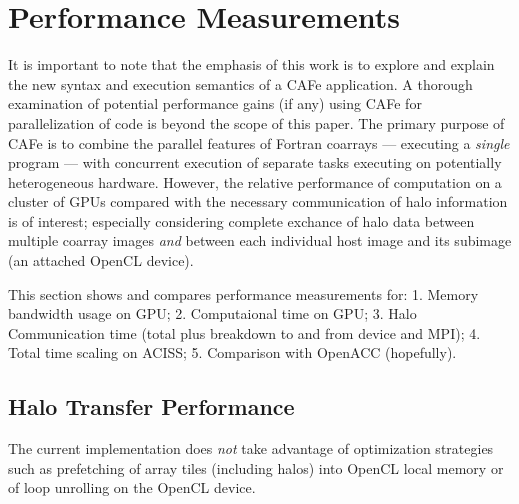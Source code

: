 \section{Performance Measurements}

It is important to note that the emphasis of this work is to explore and explain the new
syntax and execution semantics of a CAFe application.  A thorough examination of potential
performance gains (if any) using CAFe for parallelization of code is beyond the scope of
this paper.  The primary purpose of CAFe is to combine the parallel features of Fortran coarrays
--- executing a \emph{single} program --- with concurrent execution of separate tasks executing on
potentially heterogeneous hardware.  However, the relative performance of computation on
a cluster of GPUs compared with the necessary communication of halo information is
of interest; especially considering complete exchance of halo data between multiple
coarray images \emph{and} between each individual host image and its subimage (an attached
OpenCL device).


This section shows and compares performance measurements for: 1. Memory bandwidth usage on
GPU; 2. Computaional time on GPU; 3. Halo Communication time (total plus breakdown to and
from device and MPI); 4. Total time scaling on ACISS; 5. Comparison with OpenACC
(hopefully).

\subsection{Halo Transfer Performance}

The current implementation does \emph{not} take advantage of optimization strategies such
as prefetching of array tiles (including halos) into OpenCL local memory or of loop
unrolling on the OpenCL device.


\begin{comment}
Since many scientific codes are dominated by memory performance, including and especially
stencil algorithms as they typically only involve a computation on a small locally central
array element and a small overlapping halo region.  Stencil operations frequently do not
contain enough floating point operations per memory load to allow for floating point
performance to operate at peak (though this is entirely application and domain specific).
Thus we illustrate the \emph{potential} for performance by noting the latency and
throughput performance of an attached GPU in conjunction with MPI distributed memory
performance associated with halo transfer in Table 1.
\end{comment}

